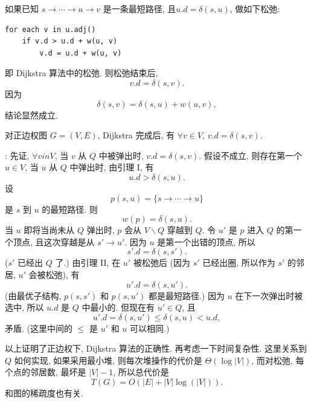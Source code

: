\documentclass[a4paper]{ctexart}
\theoremstyle{definition}
\theoremstyle{definition}
\begin{document}
 如果已知 $s \to \cdots \to u \to v$ 是一条最短路径,
且$u.d = \delta(s, u)$, 做如下松弛:
\begin{verbatim}
for each v in u.adj()
    if v.d > u.d + w(u, v)
        v.d = u.d + w(u, v)
\end{verbatim}
即 Dijkstra 算法中的松弛. 则松弛结束后,
$$
v.d = \delta(s, v).
$$
 因为
$$
\delta(s, v) = \delta(s, u) + w(u, v),
$$
结论显然成立.

 对正边权图 $G = (V, E)$,
Dijkstra 完成后, 有 $\forall v \in V$, $v.d = \delta(s, v)$.

: 先证, $\forall v in V$, 当 $v$ 从 $Q$ 中被弹出时,
$v.d = \delta(s, v)$. 假设不成立, 则存在第一个 $u \in V$, 当 $u$ 从 $Q$ 中弹出时,
由引理 I, 有
$$
u.d > \delta(s, u).
$$
设
$$
p(s, u) = \{ s \to \cdots \to u \}
$$
是 $s$ 到 $u$ 的最短路径. 则
$$
w(p) = \delta(s, u).
$$
当 $u$ 即将当尚未从 $Q$ 弹出时, $p$ 会从 $V \backslash Q$ 穿越到 $Q$. 令 $u'$ 是
$p$ 进入 $Q$ 的第一个顶点, 且这次穿越是从 $s' \to u'$. 因为 $u$ 是第一个出错的顶点,
所以
$$
s'.d = \delta(s, s').
$$
($s'$ 已经出 $Q$ 了.) 由引理 II, 在 $u'$ 被松弛后 (因为 $s'$ 已经出圈,
所以作为 $s'$ 的邻居, $u'$ 会被松弛), 有
$$
u'.d = \delta(s, u').
$$
(由最优子结构, $p(s, s')$ 和 $p(s, u')$ 都是最短路径.)
因为 $u$ 在下一次弹出时被选中, 所以 $u.d$ 是 $Q$ 中最小的.
但现在有 $u' \in Q$, 且
$$
u'.d = \delta(s, u') \leq \delta(s, u) < u.d,
$$
矛盾. (这里中间的 $\leq$ 是 $u'$ 和 $u$ 可以相同.)

以上证明了正边权下, Dijkstra 算法的正确性. 再考虑一下时间复杂性. 这里关系到 $Q$ 如何实现,
如果采用最小堆, 则每次堆操作的代价是 $\Theta(\log |V|)$, 而对松弛, 每个点的邻居数,
最坏是 $|V| - 1$, 所以总代价是
$$
T(G) = O(|E| + |V|\log(|V|)). 
$$
和图的稀疏度也有关.


\end{document}
